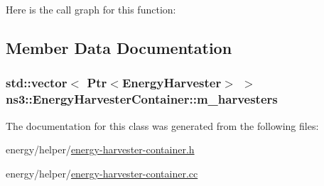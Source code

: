 Here is the call graph for this function\+:




\subsection{Member Data Documentation}
\subsubsection[{\texorpdfstring{m\+\_\+harvesters}{m_harvesters}}]{\setlength{\rightskip}{0pt plus 5cm}std\+::vector$<$ {\bf Ptr}$<${\bf Energy\+Harvester}$>$ $>$ ns3\+::\+Energy\+Harvester\+Container\+::m\+\_\+harvesters\hspace{0.3cm}{\ttfamily [private]}}\hypertarget{classns3_1_1EnergyHarvesterContainer_a349e5cd702eca63e57c42d451eb4ec2d}{}\label{classns3_1_1EnergyHarvesterContainer_a349e5cd702eca63e57c42d451eb4ec2d}


The documentation for this class was generated from the following files\+:\begin{DoxyCompactItemize}
\item 
energy/helper/\hyperlink{energy-harvester-container_8h}{energy-\/harvester-\/container.\+h}\item 
energy/helper/\hyperlink{energy-harvester-container_8cc}{energy-\/harvester-\/container.\+cc}\end{DoxyCompactItemize}
